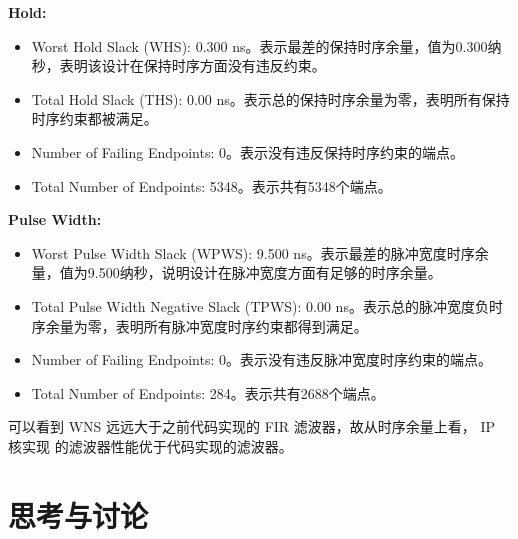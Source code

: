 \textbf{Hold:}  
\begin{itemize}
\item Worst Hold Slack (WHS): 0.300 ns。表示最差的保持时序余量，值为0.300纳秒，表明该设计在保持时序方面没有违反约束。  
\item Total Hold Slack (THS): 0.00 ns。表示总的保持时序余量为零，表明所有保持时序约束都被满足。  
\item Number of Failing Endpoints: 0。表示没有违反保持时序约束的端点。  
\item Total Number of Endpoints: 5348。表示共有5348个端点。
\end{itemize}

\textbf{Pulse Width:}  
\begin{itemize}
  \item Worst Pulse Width Slack (WPWS): 9.500 ns。表示最差的脉冲宽度时序余量，值为9.500纳秒，说明设计在脉冲宽度方面有足够的时序余量。  
  \item Total Pulse Width Negative Slack (TPWS): 0.00 ns。表示总的脉冲宽度负时序余量为零，表明所有脉冲宽度时序约束都得到满足。  
  \item Number of Failing Endpoints: 0。表示没有违反脉冲宽度时序约束的端点。  
\item Total Number of Endpoints: 284。表示共有2688个端点。
\end{itemize}

可以看到 WNS 远远大于之前代码实现的 FIR 滤波器，故从时序余量上看， IP 核实现 的滤波器性能优于代码实现的滤波器。

\section{思考与讨论}
